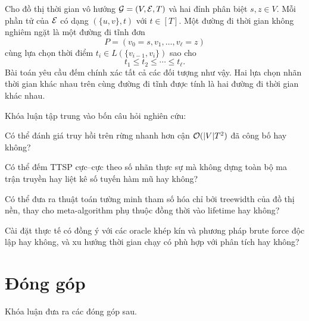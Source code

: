 Cho đồ thị thời gian vô hướng $\mathcal{G}=(V,\mathcal{E},T)$ và hai đỉnh phân biệt $s,z\in V$. Mỗi phần tử của $\mathcal{E}$ có dạng $(\{u,v\},t)$ với $t\in[T]$. Một đường đi thời gian không nghiêm ngặt là một đường đi tĩnh đơn
\[
  P=(v_0=s,v_1,\ldots,v_\ell=z)
\]
cùng lựa chọn thời điểm $t_i\in L(\{v_{i-1},v_i\})$ sao cho
\[
  t_1\le t_2\le\cdots\le t_\ell.
\]
Bài toán \TP{} yêu cầu đếm chính xác tất cả các đối tượng như vậy. Hai lựa chọn nhãn thời gian khác nhau trên cùng đường đi tĩnh được tính là hai đường đi thời gian khác nhau.

Khóa luận tập trung vào bốn câu hỏi nghiên cứu:

\begin{description}[leftmargin=2.2cm,style=nextline]
  \item[RQ1.] Có thể đánh giá truy hồi trên rừng nhanh hơn cận $\mathcal{O}(|V|T^2)$ đã công bố hay không?
  \item[RQ2.] Có thể đếm TTSP cực--cực theo số nhãn thực sự mà không dựng toàn bộ ma trận truyền hay liệt kê số tuyến hàm mũ hay không?
  \item[RQ3.] Có thể đưa ra thuật toán tường minh tham số hóa chỉ bởi treewidth của đồ thị nền, thay cho meta-algorithm phụ thuộc đồng thời vào lifetime hay không?
  \item[RQ4.] Cài đặt thực tế có đồng ý với các oracle khép kín và phương pháp brute force độc lập hay không, và xu hướng thời gian chạy có phù hợp với phân tích hay không?
\end{description}

\section{Đóng góp}

Khóa luận đưa ra các đóng góp sau.

